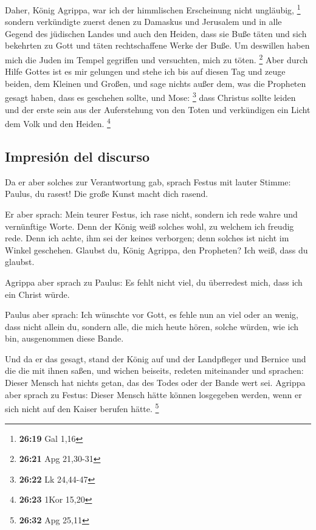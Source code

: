  Daher, König Agrippa, war ich der himmlischen
Erscheinung nicht ungläubig, \footnote{\textbf{26:19} Gal 1,16}
 sondern verkündigte zuerst denen zu Damaskus und
Jerusalem und in alle Gegend des jüdischen Landes und auch den Heiden,
dass sie Buße täten und sich bekehrten zu Gott und täten rechtschaffene
Werke der Buße.  Um deswillen haben mich die Juden im
Tempel gegriffen und versuchten, mich zu töten. \footnote{\textbf{26:21}
  Apg 21,30-31}  Aber durch Hilfe Gottes ist es mir
gelungen und stehe ich bis auf diesen Tag und zeuge beiden, dem Kleinen
und Großen, und sage nichts außer dem, was die Propheten gesagt haben,
dass es geschehen sollte, und Mose: \footnote{\textbf{26:22} Lk 24,44-47}
 dass Christus sollte leiden und der erste sein aus der
Auferstehung von den Toten und verkündigen ein Licht dem Volk und den
Heiden. \footnote{\textbf{26:23} 1Kor 15,20}

\hypertarget{impresiuxf3n-del-discurso}{%
\subsection{Impresión del discurso}\label{impresiuxf3n-del-discurso}}

 Da er aber solches zur Verantwortung gab, sprach Festus
mit lauter Stimme: Paulus, du rasest! Die große Kunst macht dich rasend.

 Er aber sprach: Mein teurer Festus, ich rase nicht,
sondern ich rede wahre und vernünftige Worte.  Denn der
König weiß solches wohl, zu welchem ich freudig rede. Denn ich achte,
ihm sei der keines verborgen; denn solches ist nicht im Winkel
geschehen.  Glaubst du, König Agrippa, den Propheten? Ich
weiß, dass du glaubst.

 Agrippa aber sprach zu Paulus: Es fehlt nicht viel, du
überredest mich, dass ich ein Christ würde.

 Paulus aber sprach: Ich wünschte vor Gott, es fehle nun
an viel oder an wenig, dass nicht allein du, sondern alle, die mich
heute hören, solche würden, wie ich bin, ausgenommen diese Bande.

 Und da er das gesagt, stand der König auf und der
Landpfleger und Bernice und die die mit ihnen saßen,  und
wichen beiseits, redeten miteinander und sprachen: Dieser Mensch hat
nichts getan, das des Todes oder der Bande wert sei. 
Agrippa aber sprach zu Festus: Dieser Mensch hätte können losgegeben
werden, wenn er sich nicht auf den Kaiser berufen hätte. \footnote{\textbf{26:32}
  Apg 25,11}

